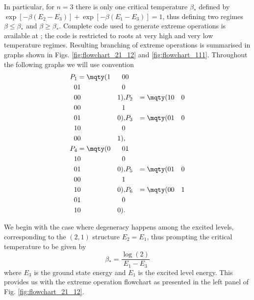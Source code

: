 \documentclass[11pt,a4paper,longbibliography]{amsart}
\numberwithin{equation}{section}
\theoremstyle{plain}
\theoremstyle{definition}
\theoremstyle{remark}
\begin{document}
			
			In particular, for $n=3$ there is only one  critical temperature $\beta_*$ defined by $\exp[-\beta(E_2 - E_3)] + \exp[-\beta(E_1 - E_3)] = 1$, thus defining two regimes $\beta \leq \beta_*$ and $\beta \geq \beta_*$. 
			Complete code used to generate extreme operations is available at \cite{github}; the code is restricted to roots at very high and very low temperature regimes. Resulting branching of extreme operations is summarised in graphs shown in Figs. \ref{fig:flowchart_21_12} and \ref{fig:flowchart_111}.
			Throughout the following graphs we will use convention
			\begin{equation}
				\begin{aligned}
					P_1 & = \mqty(
					1 & 0 & 0 \\
					0 & 1 & 0 \\
					0 & 0 & 1), & 
					P_2 & = \mqty(
					1 & 0 & 0 \\
					0 & 0 & 1 \\
					0 & 1 & 0), &
					P_3 & = \mqty(
					0 & 1 & 0 \\
					1 & 0 & 0 \\
					0 & 0 & 1), \\
					P_4 & = \mqty(
					0 & 0 & 1 \\
					1 & 0 & 0 \\
					0 & 1 & 0
					), & 
					P_5 & = \mqty(
					0 & 1 & 0 \\
					0 & 0 & 1 \\
					1 & 0 & 0
					), &
					P_6 & = \mqty(
					0 & 0 & 1 \\
					0 & 1 & 0 \\
					1 & 0 & 0
					).
				\end{aligned}
			\end{equation}
			
			We begin with the case where degeneracy happens among the excited levels, corresponding to the $(2,1)$ structure $E_2 = E_1$, thus prompting the critical temperature to be given by
			\begin{equation}
				\beta_* = \frac{\log(2)}{E_1 - E_3} 
			\end{equation}
			where $E_3$ is the ground state energy and $E_1$ is the excited level energy. This provides us with the extreme operation flowchart as presented in the left panel of Fig. \ref{fig:flowchart_21_12}.
			
\end{document}
